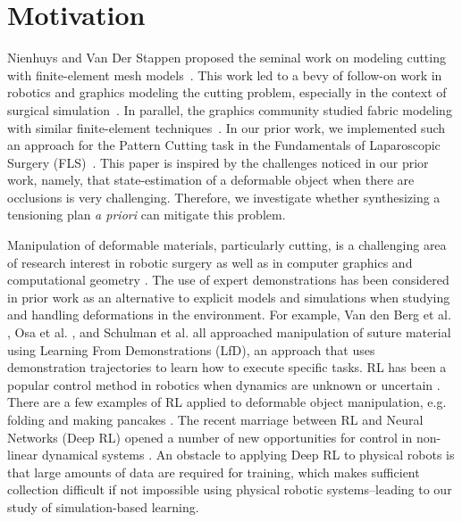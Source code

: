 \section{Motivation}
Nienhuys and Van Der Stappen proposed the seminal work on modeling cutting with finite-element mesh models~\cite{nienhuys2001surgery}.
This work led to a bevy of follow-on work in robotics and graphics modeling the cutting problem, especially in the context of surgical simulation~\cite{bielser2004state, sifakis2007arbitrary, mendoza2003simulating, steinemann2006hybrid}.
In parallel, the graphics community studied fabric modeling with similar finite-element techniques~\cite{gale2016patterning, brookes16tearable}.
In our prior work, we implemented such an approach for the Pattern Cutting task in the Fundamentals of Laparoscopic Surgery (FLS)~\cite{thananjeyanmultilateral}.
This paper is inspired by the challenges noticed in our prior work, namely, that state-estimation of a deformable object when there are occlusions is very challenging. 
Therefore, we investigate whether synthesizing a tensioning plan \emph{a priori} can mitigate this problem.

Manipulation of deformable materials, particularly cutting, is a challenging area of research interest in robotic surgery \cite{nienhuys2001surgery, murali2015learning} as well as in computer graphics and computational geometry \cite{zhang2004cutting,Chentanez2009}. The use of expert demonstrations has been considered in prior work as an alternative to explicit models and simulations when studying and handling deformations in the environment. For example, Van den Berg et al. \cite{vandenBerg2010}, Osa et al. \cite{Osa2014}, and Schulman et al. \cite{Schulman2013} all approached manipulation of suture material using Learning From Demonstrations (LfD), an approach that uses demonstration trajectories to learn how to execute specific tasks.
RL has been a popular control method in robotics when dynamics are unknown or uncertain \cite{kober2013reinforcement}.
There are a few examples of RL applied to deformable object manipulation, e.g. folding \cite{balaguer2011combining} and making pancakes \cite{beetz2011robotic}.
The recent marriage between RL and Neural Networks (Deep RL)  opened a number of new opportunities for control in non-linear dynamical systems \cite{levine2015end}.
An obstacle to applying Deep RL to physical robots is that large amounts  of data are required for training, which makes sufficient collection difficult if not impossible using physical robotic systems--leading to our study of simulation-based learning.


